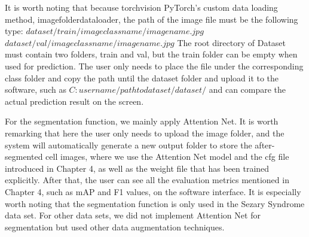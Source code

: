 It is worth noting that because torchvision PyTorch's custom data loading method, imagefolderdataloader, the path of the image file must be the following type:\newline
$dataset/train/imageclassname/imagename.jpg$ \newline
$dataset/val/imageclassname/imagename.jpg$\newline
The root directory of Dataset must contain two folders, train and val, but the train folder can be empty when used for prediction. The user only needs to place the file under the corresponding class folder and copy the path until the dataset folder and upload it to the software, such as $C:username/pathtodataset/dataset/ $ and can compare the actual prediction result on the screen.


For the segmentation function, we mainly apply Attention Net. It is worth remarking that here the user only needs to upload the image folder, and the system will automatically generate a new output folder to store the after-segmented cell images, where we use the Attention Net model and the cfg file introduced in Chapter 4, as well as the weight file that has been trained explicitly. After that, the user can see all the evaluation metrics mentioned in Chapter 4, such as mAP and F1 values, on the software interface. 
It is especially worth noting that the segmentation function is only used in the Sezary Syndrome data set. For other data sets, we did not implement Attention Net for segmentation but used other data augmentation techniques.




